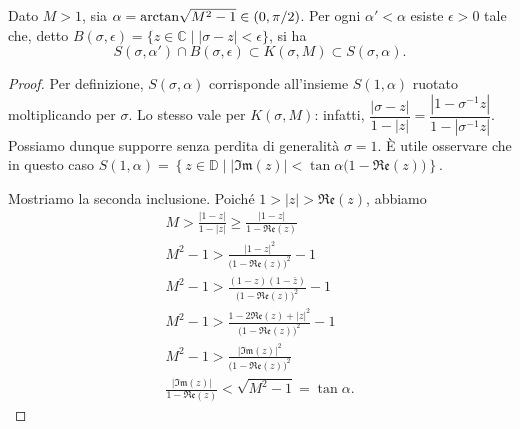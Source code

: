 \begin{prop}
  Dato $M>1$, sia $\alpha=\text{\normalfont{arctan}}\sqrt{M^2-1} \in (0,\pi/2)$. Per ogni $\alpha'<\alpha$ esiste $\epsilon>0$ tale che, detto $B(\sigma,\epsilon)=\{z \in \mathbb{C} \mid |\sigma-z|<\epsilon\}$, si ha
  $$S(\sigma,\alpha')\cap B(\sigma,\epsilon) \subset K(\sigma,M) \subset S(\sigma,\alpha).$$
\end{prop}

\begin{proof}
  Per definizione, $S(\sigma,\alpha)$ corrisponde all'insieme $S(1,\alpha)$ ruotato moltiplicando per $\sigma$. Lo stesso vale per $K(\sigma,M)$: infatti, $\dfrac{|\sigma-z|}{1-|z|}=\dfrac{|1-\sigma^{-1}z|}{1-|\sigma^{-1}z|}$. Possiamo dunque supporre senza perdita di generalità $\sigma=1$. È utile osservare che in questo caso $S(1,\alpha)=\left\{z \in \mathbb{D} \mid |\mathfrak{Im}(z)|<\tan{\alpha}\bigl(1-\mathfrak{Re}(z)\bigr)\right\}$.

  Mostriamo la seconda inclusione. Poiché $1>|z|>\mathfrak{Re}(z)$, abbiamo
  \begin{gather*}
    M>\frac{|1-z|}{1-|z|}\ge \frac{|1-z|}{1-\mathfrak{Re}(z)} \\
    M^2-1 > \frac{|1-z|^2}{\bigl(1-\mathfrak{Re}(z)\bigr)^2}-1 \\
    M^2-1 > \frac{(1-z)(1-\bar{z})}{\bigl(1-\mathfrak{Re}(z)\bigr)^2}-1 \\
    M^2-1 > \frac{1-2\mathfrak{Re}(z)+|z|^2}{\bigl(1-\mathfrak{Re}(z)\bigr)^2}-1 \\
    M^2-1 > \frac{|\mathfrak{Im}(z)|^2}{\bigl(1-\mathfrak{Re}(z)\bigr)^2} \\
    \frac{|\mathfrak{Im}(z)|}{1-\mathfrak{Re}(z)}<\sqrt{M^2-1}=\tan{\alpha}.
  \end{gather*}


\end{proof}
